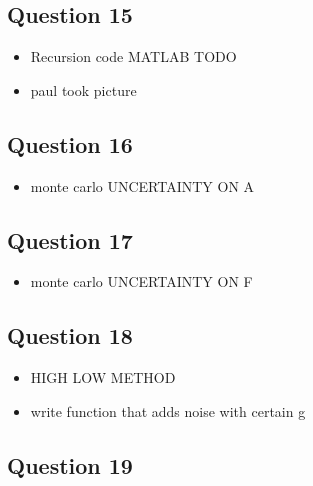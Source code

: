 \documentclass[11pt,a4paper]{article}
\begin{document}
\subsection*{Question 15}
\begin{itemize}
	\item Recursion code MATLAB TODO
	\item paul took picture
\end{itemize}

\subsection*{Question 16}
\begin{itemize}
	\item monte carlo UNCERTAINTY ON A
\end{itemize}

\subsection*{Question 17}
\begin{itemize}
	\item monte carlo UNCERTAINTY ON F
\end{itemize}

\subsection*{Question 18}
\begin{itemize}
	\item HIGH LOW METHOD
	\item write function that adds noise with certain g
\end{itemize}

\subsection*{Question 19}
\end{document}
